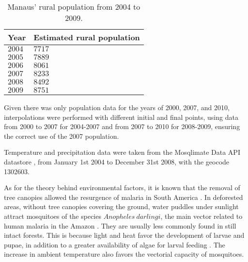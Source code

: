 \documentclass[a4paper,fleqn]{cas-dc}
\begin{document}
\begin{table}[width=.9\linewidth,cols=4,pos=h]
\caption{Manaus' rural population from 2004 to 2009.}\label{tbl1}
\begin{tabular*}{\tblwidth}{@{} LL@{} } %
\toprule
\textbf{Year}  & \textbf{Estimated rural population}\\
\midrule
$2004$ & $7717$ \\
 $2005$ & $7889$ \\
$2006$ & $8061$ \\
$2007$ & $8233$ \\
$2008$ & $8492$ \\
$2009$ & $8751$ \\
\bottomrule
\end{tabular*}
\end{table}


Given there was only population data for the years of 2000, 2007, and 2010, 
interpolations were performed with different initial and final 
points, using data from 2000 to 2007 for 2004-2007 and from 2007 
to 2010 for 2008-2009, ensuring the correct use of the 2007 population.

Temperature and precipitation data were taken from the Mosqlimate Data API datastore \cite{MosqlimateAPI}, from January 1st 2004 to December 31st 2008, with the geocode 1302603.

As for the theory behind environmental factors, it is known that the removal of tree canopies allowed 
the resurgence of malaria in South America \cite{Norris2004}. In deforested areas, 
without tree canopies covering the ground, water puddles under sunlight 
attract mosquitoes of the species $Anopheles \ darlingi$, the main vector 
related to human malaria in the Amazon \cite{infoAnopheles}. They are 
usually less commonly found in still intact forests. This is 
because light and heat favor the development of larvae and 
pupae, in addition to a greater availability of algae for 
larval feeding \cite{article_alteracoesambientais}. The increase 
in ambient temperature also favors the vectorial capacity of 
mosquitoes. 
\end{document}
